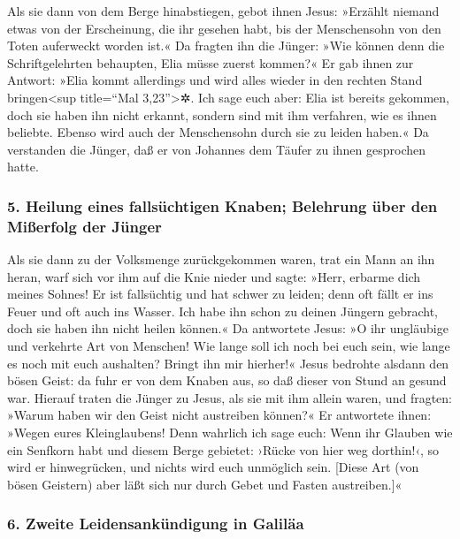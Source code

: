  Als sie dann von dem Berge hinabstiegen, gebot ihnen
Jesus: »Erzählt niemand etwas von der Erscheinung, die ihr gesehen habt,
bis der Menschensohn von den Toten auferweckt worden ist.«
 Da fragten ihn die Jünger: »Wie können denn die
Schriftgelehrten behaupten, Elia müsse zuerst kommen?« 
Er gab ihnen zur Antwort: »Elia kommt allerdings und wird alles wieder
in den rechten Stand bringen\textless sup title=``Mal
3,23''\textgreater✲.  Ich sage euch aber: Elia ist
bereits gekommen, doch sie haben ihn nicht erkannt, sondern sind mit ihm
verfahren, wie es ihnen beliebte. Ebenso wird auch der Menschensohn
durch sie zu leiden haben.«  Da verstanden die Jünger,
daß er von Johannes dem Täufer zu ihnen gesprochen hatte.

\hypertarget{heilung-eines-fallsuxfcchtigen-knaben-belehrung-uxfcber-den-miuxdferfolg-der-juxfcnger}{%
\subsubsection{5. Heilung eines fallsüchtigen Knaben; Belehrung über den
Mißerfolg der
Jünger}\label{heilung-eines-fallsuxfcchtigen-knaben-belehrung-uxfcber-den-miuxdferfolg-der-juxfcnger}}

 Als sie dann zu der Volksmenge zurückgekommen waren,
trat ein Mann an ihn heran, warf sich vor ihm auf die Knie nieder
 und sagte: »Herr, erbarme dich meines Sohnes! Er ist
fallsüchtig und hat schwer zu leiden; denn oft fällt er ins Feuer und
oft auch ins Wasser.  Ich habe ihn schon zu deinen
Jüngern gebracht, doch sie haben ihn nicht heilen können.«
 Da antwortete Jesus: »O ihr ungläubige und verkehrte Art
von Menschen! Wie lange soll ich noch bei euch sein, wie lange es noch
mit euch aushalten? Bringt ihn mir hierher!«  Jesus
bedrohte alsdann den bösen Geist: da fuhr er von dem Knaben aus, so daß
dieser von Stund an gesund war.  Hierauf traten die
Jünger zu Jesus, als sie mit ihm allein waren, und fragten: »Warum haben
wir den Geist nicht austreiben können?«  Er antwortete
ihnen: »Wegen eures Kleinglaubens! Denn wahrlich ich sage euch: Wenn ihr
Glauben wie ein Senfkorn habt und diesem Berge gebietet: ›Rücke von hier
weg dorthin!‹, so wird er hinwegrücken, und nichts wird euch unmöglich
sein.  {[}Diese Art (von bösen Geistern) aber läßt sich
nur durch Gebet und Fasten austreiben.{]}«

\hypertarget{zweite-leidensankuxfcndigung-in-galiluxe4a}{%
\subsubsection{6. Zweite Leidensankündigung in
Galiläa}\label{zweite-leidensankuxfcndigung-in-galiluxe4a}}

